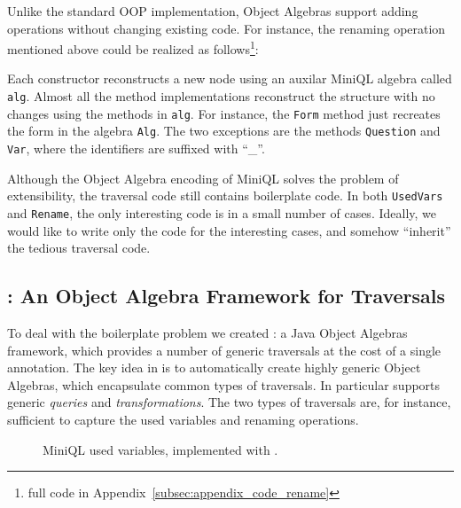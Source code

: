 Unlike the standard OOP implementation, 
Object Algebras support adding operations without changing existing code.
For instance, the renaming operation mentioned above could be realized
as follows\footnote{full code in
  Appendix~\ref{subsec:appendix_code_rename}}:


Each
constructor reconstructs a new node using an auxilar MiniQL algebra  called \lstinline{alg}.
Almost all the method implementations reconstruct the structure with
no changes using the methods in \lstinline{alg}. For instance, the \lstinline{Form} method just recreates the form in the algebra \lstinline{Alg}.  The two exceptions are the
methods \lstinline{Question} and \lstinline{Var}, where the identifiers are suffixed with ``\_''.

Although the Object Algebra encoding of MiniQL solves the problem of extensibility, the traversal code still contains boilerplate code.
In both \lstinline{UsedVars} and \lstinline{Rename}, the only interesting code
is in a small number of cases.  Ideally, we would like to write only
the code for the interesting cases, and somehow ``inherit'' the
tedious traversal code.

\subsection{\Name: An Object Algebra Framework for Traversals}

To deal with the boilerplate problem we created \Name: a Java Object
Algebras framework, which provides a number of generic traversals at
the cost of a single annotation. The key idea in \name is to
automatically create highly generic Object Algebras, which encapsulate
common types of traversals. In particular \name supports generic
\emph{queries} and \emph{transformations}. The two types of
traversals are, for instance,  sufficient to capture the used variables and
renaming operations.

\begin{figure}[t]
\nocaptionrule
\caption{MiniQL used variables, implemented with \Name.}
\label{usedvars_with_oaframework}
\end{figure}

